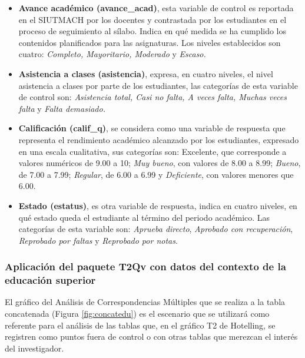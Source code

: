 \documentclass[mathematics,article,submit,moreauthors,pdftex]{mdpi}
\begin{document}
\begin{itemize}
\item
  \textbf{Avance académico (avance\_acad)}, esta variable de control es
  reportada en el SIUTMACH por los docentes y contrastada por los
  estudiantes en el proceso de seguimiento al sílabo. Indica en qué
  medida se ha cumplido los contenidos planificados para las
  asignaturas. Los niveles establecidos son cuatro: \emph{Completo,
  Mayoritario, Moderado} y \emph{Escaso.}\\
\item
  \textbf{Asistencia a clases (asistencia)}, expresa, en cuatro niveles,
  el nivel asistencia a clases por parte de los estudiantes, las
  categorías de esta variable de control son: \emph{Asistencia total,
  Casi no falta, A veces falta, Muchas veces falta} y \emph{Falta
  demasiado.}\\
\item
  \textbf{Calificación (calif\_q)}, se considera como una variable de
  respuesta que representa el rendimiento académico alcanzado por los
  estudiantes, expresado en una escala cualitativa, sus categorías son:
  Excelente, que corresponde a valores numéricos de 9.00 a 10; \emph{Muy
  bueno}, con valores de 8.00 a 8.99; \emph{Bueno}, de 7.00 a 7.99;
  \emph{Regular}, de 6.00 a 6.99 y \emph{Deficiente}, con valores
  menores que 6.00.\\
\item
  \textbf{Estado (estatus)}, es otra variable de respuesta, indica en
  cuatro niveles, en qué estado queda el estudiante al término del
  periodo académico. Las categorías de esta variable son: \emph{Aprueba
  directo}, \emph{Aprobado con recuperación}, \emph{Reprobado por
  faltas} y \emph{Reprobado por notas}.
\end{itemize}

\hypertarget{aplicaciuxf3n-del-paquete-t2qv-con-datos-del-contexto-de-la-educaciuxf3n-superior}{%
\subsubsection{Aplicación del paquete T2Qv con datos del contexto de la
educación
superior}\label{aplicaciuxf3n-del-paquete-t2qv-con-datos-del-contexto-de-la-educaciuxf3n-superior}}

El gráfico del Análisis de Correspondencias Múltiples que se realiza a
la tabla concatenada (Figura \ref{fig:concatedu}) es el escenario que se
utilizará como referente para el análisis de las tablas que, en el
gráfico T2 de Hotelling, se registren como puntos fuera de control o con
otras tablas que merezcan el interés del investigador.
\end{document}
